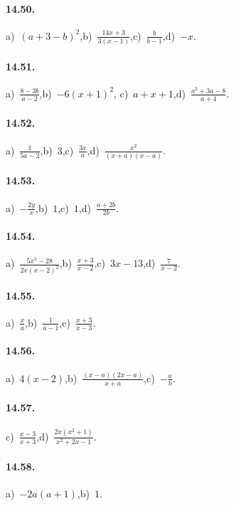 \paragraph{14.50.}
a)~$(a+3-b)^{2}$,\quad b)~$\frac{14x+3}{3(x-1)}$,\quad c)~$\frac{b}{b-1}$,\quad d)~$-x$.

\paragraph{14.51.}
a)~$\frac{8-3b}{a-2}$,\quad b)~$-6(x+1)^{2}$, \quad c)~$a+x+1$,\quad d)~$\frac{a^{2}+3a-8}{a+4}$.

\paragraph{14.52.}
a)~$\frac{1}{5a-2}$,\quad b)~$3$,\quad c)~$\frac{3x}{a}$,\quad d)~$\frac{x^{2}}{(x+a)(x-a)}$.

\paragraph{14.53.}
a)~$-\frac{2y}{x}$,\quad b)~$1$,\quad c)~$1$,\quad d)~$\frac{a+2b}{2b}$. %

\paragraph{14.54.}
a)~$\frac{5x^{3}-28}{2x(x-2)^{2}}$,\quad b)~$\frac{x+3}{x-2}$,\quad c)~$3x-13$,\quad d)~$\frac{7}{x-2}$.

\paragraph{14.55.}
a)~$\frac{x}{a}$,\quad b)~$\frac{1}{a-1}$,\quad c)~$\frac{x+3}{x-3}$.

\paragraph{14.56.}
a)~$4(x-2)$,\quad b)~$\frac{(x-a)(2x-a)}{x+a}$,\quad c)~$-\frac{a}{b}$.

\paragraph{14.57.}
c)~$\frac{x-3}{x+3}$,\quad d)~$\frac{2x\left(x^{2}+1\right)}{x^{2}+2x-1}$.

\paragraph{14.58.}
a)~$-2a(a+1)$,\quad b)~$1$.

